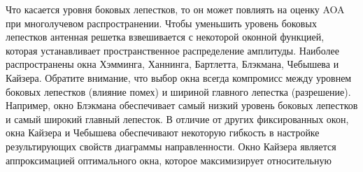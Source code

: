 Что касается уровня боковых лепестков, то он может повлиять на оценку AOA при многолучевом распространении. Чтобы уменьшить уровень боковых
лепестков антенная решетка взвешивается с некоторой оконной функцией, которая
устанавливает пространственное распределение амплитуды. 
Наиболее распространены окна Хэмминга, Ханнинга, Бартлетта, Блэкмана,
Чебышева и Кайзера. Обратите внимание, что выбор окна всегда компромисс между
уровнем боковых лепестков (влияние помех) и шириной главного лепестка
(разрешение).  Например, окно Блэкмана обеспечивает самый низкий уровень
боковых лепестков и самый широкий главный лепесток.  В отличие от других
фиксированных окон, окна Кайзера и Чебышева обеспечивают некоторую гибкость в
настройке результирующих свойств диаграммы направленности. Окно Кайзера
является аппроксимацией оптимального окна, которое максимизирует относительную
